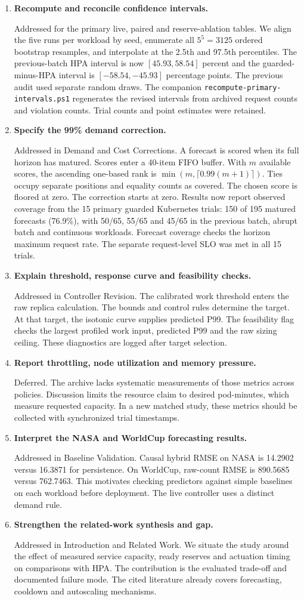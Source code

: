 \documentclass[10pt,a4paper]{article}
\newcommand{\reply}[2]{\item \textbf{#1}\par\noindent #2}
\begin{document}
\begin{enumerate}
\reply{Recompute and reconcile confidence intervals.}{Addressed for the primary live, paired and reserve-ablation tables. We align the five runs per workload by seed, enumerate all \(5^5=3125\) ordered bootstrap resamples, and interpolate at the 2.5th and 97.5th percentiles. The previous-batch HPA interval is now \([45.93,58.54]\) percent and the guarded-minus-HPA interval is \([-58.54,-45.93]\) percentage points. The previous audit used separate random draws. The companion \texttt{recompute-primary-intervals.ps1} regenerates the revised intervals from archived request counts and violation counts. Trial counts and point estimates were retained.}
\reply{Specify the 99\% demand correction.}{Addressed in Demand and Cost Corrections. A forecast is scored when its full horizon has matured. Scores enter a 40-item FIFO buffer. With \(m\) available scores, the ascending one-based rank is \(\min(m,\lceil0.99(m+1)\rceil)\). Ties occupy separate positions and equality counts as covered. The chosen score is floored at zero. The correction starts at zero. Results now report observed coverage from the 15 primary guarded Kubernetes trials: 150 of 195 matured forecasts (76.9\%), with 50/65, 55/65 and 45/65 in the previous batch, abrupt batch and continuous workloads. Forecast coverage checks the horizon maximum request rate. The separate request-level SLO was met in all 15 trials.}
\reply{Explain threshold, response curve and feasibility checks.}{Addressed in Controller Revision. The calibrated work threshold enters the raw replica calculation. The bounds and control rules determine the target. At that target, the isotonic curve supplies predicted P99. The feasibility flag checks the largest profiled work input, predicted P99 and the raw sizing ceiling. These diagnostics are logged after target selection.}
\reply{Report throttling, node utilization and memory pressure.}{Deferred. The archive lacks systematic measurements of those metrics across policies. Discussion limits the resource claim to desired pod-minutes, which measure requested capacity. In a new matched study, these metrics should be collected with synchronized trial timestamps.}
\reply{Interpret the NASA and WorldCup forecasting results.}{Addressed in Baseline Validation. Causal hybrid RMSE on NASA is 14.2902 versus 16.3871 for persistence. On WorldCup, raw-count RMSE is 890.5685 versus 762.7463. This motivates checking predictors against simple baselines on each workload before deployment. The live controller uses a distinct demand rule.}
\reply{Strengthen the related-work synthesis and gap.}{Addressed in Introduction and Related Work. We situate the study around the effect of measured service capacity, ready reserves and actuation timing on comparisons with HPA. The contribution is the evaluated trade-off and documented failure mode. The cited literature already covers forecasting, cooldown and autoscaling mechanisms.}
\end{enumerate}
\end{document}
